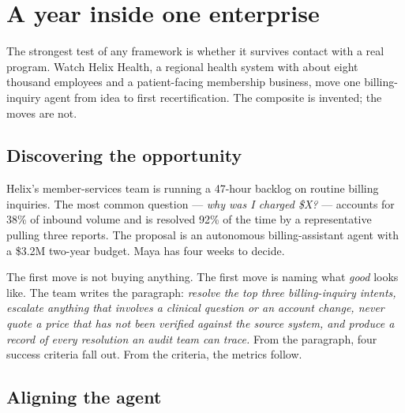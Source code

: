 \label{ch:synthesis}

\starttwocol

\section{A year inside one enterprise}

The strongest test of any framework is whether it survives contact with a real program. Watch Helix Health, a regional health system with about eight thousand employees and a patient-facing membership business, move one billing-inquiry agent from idea to first recertification. The composite is invented; the moves are not.

\subsection{Discovering the opportunity}

Helix's member-services team is running a 47-hour backlog on routine billing inquiries. The most common question --- \textit{why was I charged \$X?} --- accounts for 38\% of inbound volume and is resolved 92\% of the time by a representative pulling three reports. The proposal is an autonomous billing-assistant agent with a \$3.2M two-year budget. Maya has four weeks to decide.

The first move is not buying anything. The first move is naming what \textit{good} looks like. The team writes the paragraph: \textit{resolve the top three billing-inquiry intents, escalate anything that involves a clinical question or an account change, never quote a price that has not been verified against the source system, and produce a record of every resolution an audit team can trace.} From the paragraph, four success criteria fall out. From the criteria, the metrics follow.

\subsection{Aligning the agent}

